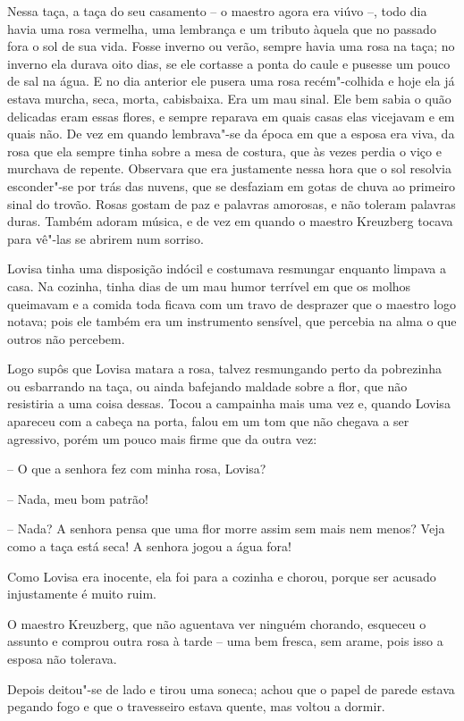 Nessa taça, a taça do seu casamento -- o maestro agora era viúvo --, todo
dia havia uma rosa vermelha, uma lembrança e um tributo àquela que no
passado fora o sol de sua vida. Fosse inverno ou verão, sempre havia
uma rosa na taça; no inverno ela durava oito dias, se ele cortasse a
ponta do caule e pusesse um pouco de sal na água. E no dia anterior ele
pusera uma rosa recém"-colhida e hoje ela já estava murcha, seca,
morta, cabisbaixa. Era um mau sinal. Ele bem sabia o quão delicadas
eram essas flores, e sempre reparava em quais casas elas vicejavam e em
quais não. De vez em quando lembrava"-se da época em que a esposa era
viva, da rosa que ela sempre tinha sobre a mesa de costura, que às
vezes perdia o viço e murchava de repente. Observara que era justamente
nessa hora que o sol resolvia esconder"-se por trás das nuvens, que
se desfaziam em gotas de chuva ao primeiro sinal do trovão. Rosas gostam de
paz e palavras amorosas, e não toleram palavras duras. Também adoram
música, e de vez em quando o maestro Kreuzberg tocava para vê"-las 
se abrirem num sorriso.

Lovisa tinha uma disposição indócil e costumava resmungar enquanto
limpava a casa. Na cozinha, tinha dias de um mau humor terrível em que
os molhos queimavam e a comida toda ficava com um travo de desprazer
que o maestro logo notava; pois ele também era um instrumento sensível,
que percebia na alma o que outros não percebem.

Logo supôs que Lovisa matara a rosa, talvez resmungando perto da
pobrezinha ou esbarrando na taça, ou ainda bafejando maldade sobre a
flor, que não resistiria a uma coisa dessas. Tocou a campainha mais uma
vez e, quando Lovisa apareceu com a cabeça na porta, falou em um tom
que não chegava a ser agressivo, porém um pouco mais firme que da outra
vez:

-- O que a senhora fez com minha rosa, Lovisa?

-- Nada, meu bom patrão!

-- Nada? A senhora pensa que uma flor morre assim sem mais nem menos?
Veja como a taça está seca! A senhora jogou a água fora!

Como Lovisa era inocente, ela foi para a cozinha e chorou, porque ser
acusado injustamente é muito ruim.

O maestro Kreuzberg, que não aguentava ver ninguém chorando, esqueceu o
assunto e comprou outra rosa à tarde -- uma bem fresca, sem arame, pois
isso a esposa não tolerava. 

Depois deitou"-se de lado e tirou uma soneca; achou que o papel de
parede estava pegando fogo e que o travesseiro estava quente, mas
voltou a dormir. 

